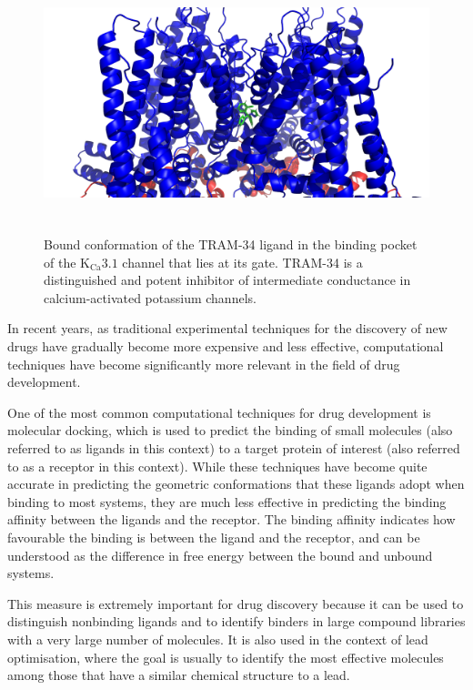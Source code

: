 \begin{figure}[h]
\includegraphics[width=12cm, height=7.5cm]{Images/Introduction/tram34_docking.png}
\centering
\caption{Bound conformation of the TRAM-34 ligand in the binding pocket of the $\text{K}_{\text{Ca}}3.1$ channel that lies at its gate. TRAM-34 is a distinguished and potent inhibitor of intermediate conductance in calcium-activated potassium channels.}
\label{fig:Figure 3.1}
\end{figure}

In recent years, as traditional experimental techniques for the discovery of new drugs have gradually become more expensive and less effective, computational techniques have become significantly more relevant in the field of drug development.

One of the most common computational techniques for drug development is molecular docking, which is used to predict the binding of small molecules (also referred to as ligands in this context) to a target protein of interest (also referred to as a receptor in this context). While these techniques have become quite accurate in predicting the geometric conformations that these ligands adopt when binding to most systems, they are much less effective in predicting the binding affinity between the ligands and the receptor. The binding affinity indicates how favourable the binding is between the ligand and the receptor, and can be understood as the difference in free energy between the bound and unbound systems.

This measure is extremely important for drug discovery because it can be used to distinguish nonbinding ligands and to identify binders in large compound libraries with a very large number of molecules. It is also used in the context of lead optimisation, where the goal is usually to identify the most effective molecules among those that have a similar chemical structure to a lead.

